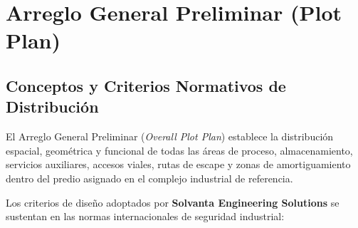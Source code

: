\documentclass[10pt,letterpaper]{article}
\begin{document}
\section{Arreglo General Preliminar (Plot Plan)}

\subsection{Conceptos y Criterios Normativos de Distribución}
El Arreglo General Preliminar (\textit{Overall Plot Plan}) establece la distribución espacial, geométrica y funcional de todas las áreas de proceso, almacenamiento, servicios auxiliares, accesos viales, rutas de escape y zonas de amortiguamiento dentro del predio asignado en el complejo industrial de referencia.

Los criterios de diseño adoptados por \textbf{Solvanta Engineering Solutions} se sustentan en las normas internacionales de seguridad industrial:
\end{document}
